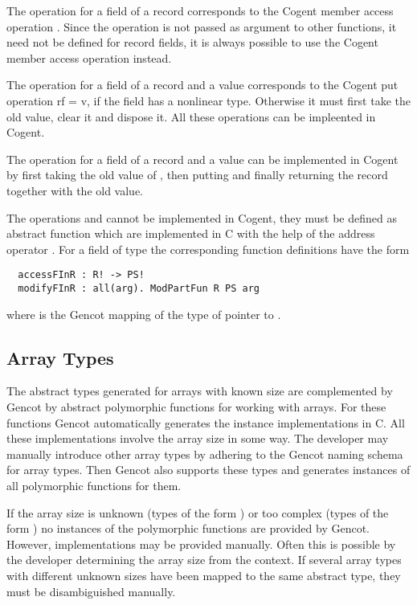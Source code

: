 The operation  for a field  of a record  corresponds to the Cogent member access operation .
Since the  operation is not passed as argument to other functions, it need not be defined for record fields, it is always possible
to use the Cogent member access operation instead.

The operation  for a field  of a record  and a value  corresponds to the Cogent put operation r{f = v}, if
the field has a nonlinear type. Otherwise it must first take the old value, clear it and dispose it. All these operations can be impleented in Cogent.

The operation  for a field  of a record  and a value  can be implemented in Cogent by first taking the 
old value of , then putting  and finally returning the record together with the old value.

The operations  and  cannot be implemented in Cogent, they must be defined as abstract function which are implemented in 
C with the help of the address operator \code{\&}. For a field  of type  the corresponding function definitions have the form
\begin{verbatim}
  accessFInR : R! -> PS!
  modifyFInR : all(arg). ModPartFun R PS arg
\end{verbatim}
where  is the Gencot mapping of the type of pointer to .

\subsection{Array Types}
\label{design-operations-array}

The abstract types generated for arrays with known size are complemented by Gencot by abstract polymorphic 
functions for working with
arrays. For these functions Gencot automatically generates the instance 
implementations in C. All these implementations involve the array size in some way. The developer may manually introduce
other array types by adhering to the Gencot naming schema for array types. Then Gencot also supports these types and
generates instances of all polymorphic functions for them.

If the array size is unknown (types of the form ) or too complex (types of the form )
no instances of the polymorphic functions are provided by Gencot. However, implementations may be provided manually. Often
this is possible by the developer determining the array size from the context. If several array types with 
different unknown sizes have been mapped to the same abstract type, they must be disambiguished manually.

